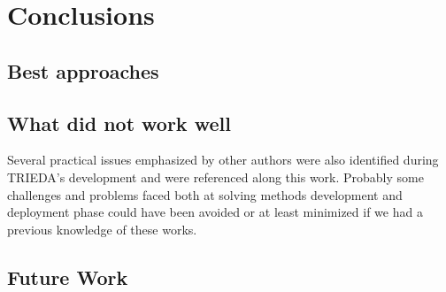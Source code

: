 \chapter{Conclusions}
\label{chap:conclusions}




\section{Best approaches}



\section{What did not work well}

Several practical issues emphasized by other authors were also identified during TRIEDA's development and were referenced along this work. Probably some challenges and problems faced both at solving methods development and deployment phase could have been avoided or at least minimized if we had a previous knowledge of these works.


\section{Future Work}





